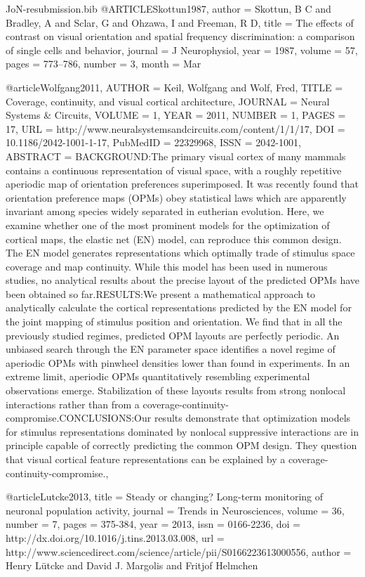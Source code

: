 \documentclass{article}
\begin{document}
\begin{filecontents}{JoN-resubmission.bib}
@ARTICLE{Skottun1987,
  author = {Skottun, B C and Bradley, A and Sclar, G and Ohzawa, I and Freeman,
	R D},
  title = {{The effects of contrast on visual orientation and spatial frequency
	discrimination: a comparison of single cells and behavior}},
  journal = {J Neurophysiol},
  year = {1987},
  volume = {57},
  pages = {773--786},
  number = {3},
  month = {Mar}
}

@article{Wolfgang2011,
AUTHOR = {Keil, Wolfgang and Wolf, Fred},
TITLE = {Coverage, continuity, and visual cortical architecture},
JOURNAL = {Neural Systems \& Circuits},
VOLUME = {1},
YEAR = {2011},
NUMBER = {1},
PAGES = {17},
URL = {http://www.neuralsystemsandcircuits.com/content/1/1/17},
DOI = {10.1186/2042-1001-1-17},
PubMedID = {22329968},
ISSN = {2042-1001},
ABSTRACT = {BACKGROUND:The primary visual cortex of many mammals contains a continuous representation of visual space, with a roughly repetitive aperiodic map of orientation preferences superimposed. It was recently found that orientation preference maps (OPMs) obey statistical laws which are apparently invariant among species widely separated in eutherian evolution. Here, we examine whether one of the most prominent models for the optimization of cortical maps, the elastic net (EN) model, can reproduce this common design. The EN model generates representations which optimally trade of stimulus space coverage and map continuity. While this model has been used in numerous studies, no analytical results about the precise layout of the predicted OPMs have been obtained so far.RESULTS:We present a mathematical approach to analytically calculate the cortical representations predicted by the EN model for the joint mapping of stimulus position and orientation. We find that in all the previously studied regimes, predicted OPM layouts are perfectly periodic. An unbiased search through the EN parameter space identifies a novel regime of aperiodic OPMs with pinwheel densities lower than found in experiments. In an extreme limit, aperiodic OPMs quantitatively resembling experimental observations emerge. Stabilization of these layouts results from strong nonlocal interactions rather than from a coverage-continuity-compromise.CONCLUSIONS:Our results demonstrate that optimization models for stimulus representations dominated by nonlocal suppressive interactions are in principle capable of correctly predicting the common OPM design. They question that visual cortical feature representations can be explained by a coverage-continuity-compromise.},
}

@article{Lutcke2013,
title = {Steady or changing? Long-term monitoring of neuronal population activity},
journal = {Trends in Neurosciences},
volume = {36},
number = {7},
pages = {375-384},
year = {2013},
issn = {0166-2236},
doi = {http://dx.doi.org/10.1016/j.tins.2013.03.008},
url = {http://www.sciencedirect.com/science/article/pii/S0166223613000556},
author = {Henry L\"{u}tcke and David J. Margolis and Fritjof Helmchen}
}


\end{filecontents}
\end{document}
